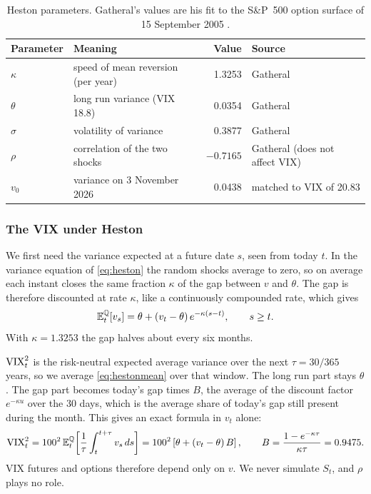 \begin{table}[H]
\centering
\small
\begin{tabular}{@{}llrl@{}}
\toprule
\textbf{Parameter} & \textbf{Meaning} & \textbf{Value} & \textbf{Source}\\
\midrule
$\kappa$ & speed of mean reversion (per year) & 1.3253 & Gatheral\\
$\theta$ & long run variance (VIX 18.8) & 0.0354 & Gatheral\\
$\sigma$ & volatility of variance & 0.3877 & Gatheral\\
$\rho$ & correlation of the two shocks & $-0.7165$ & Gatheral (does not affect VIX)\\
$v_0$ & variance on 3 November 2026 & 0.0438 & matched to VIX of 20.83\\
\bottomrule
\end{tabular}
\caption{Heston parameters. Gatheral's values are his fit to the S\&P~500 option surface of 15 September 2005 \cite[Table~3.2]{gatheral}.}
\label{tab:hestonparams}
\end{table}

\subsubsection{The VIX under Heston}
\label{sec:hestonvix}

We first need the variance expected at a future date $s$, seen from today $t$. In the variance equation of \eqref{eq:heston} the random shocks average to zero, so on average each instant closes the same fraction $\kappa$ of the gap between $v$ and $\theta$. The gap is therefore discounted at rate $\kappa$, like a continuously compounded rate, which gives
\begin{equation}
  \mathbb{E}^{\mathbb{Q}}_t[v_s] = \theta + (v_t-\theta)\,e^{-\kappa(s-t)}, \qquad s \ge t.
  \label{eq:hestonmean}
\end{equation}
With $\kappa = 1.3253$ the gap halves about every six months.

$\mathrm{VIX}_t^2$ is the risk-neutral expected average variance over the next $\tau = 30/365$ years, so we average \eqref{eq:hestonmean} over that window. The long run part stays $\theta$. The gap part becomes today's gap times $B$, the average of the discount factor $e^{-\kappa u}$ over the 30 days, which is the average share of today's gap still present during the month. This gives an exact formula in $v_t$ alone:
\begin{equation}
  \mathrm{VIX}_t^2 = 100^2\,\mathbb{E}^{\mathbb{Q}}_t\!\left[\frac{1}{\tau}\int_t^{t+\tau} v_s\,ds\right]
  = 100^2\left[\theta + (v_t - \theta)\,B\right], \qquad B = \frac{1-e^{-\kappa\tau}}{\kappa\tau} = 0.9475 .
  \label{eq:hestonvix}
\end{equation}
VIX futures and options therefore depend only on $v$. We never simulate $S_t$, and $\rho$ plays no role.


